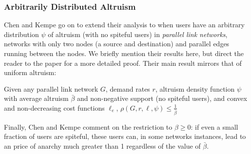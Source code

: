 \subsubsection{Arbitrarily Distributed Altruism}
Chen and Kempe go on to extend their analysis to when users have an arbitrary distribution $\psi$ of altruism (with no spiteful users) in \emph{parallel link networks}, networks with only two nodes (a source and destination) and parallel edges running between the nodes. 
We briefly mention their results here, but direct the reader to the paper for a more detailed proof.
Their main result mirrors that of uniform altruism:
\begin{theorem}
    Given any parallel link network $G$, demand rates $r$, altruism density function $\psi$ with average altruism $\bar{\beta}$ and non-negative support (no spiteful users), and convex and non-decreasing cost functions $\ell_e$,
   $\rho(G,r,\ell,\psi) \le \frac{1}{\bar{\beta}}$
\end{theorem}
Finally, Chen and Kempe comment on the restriction to $\beta \ge 0$: if even a small fraction of users are spiteful, these users can, in some networks instances, lead to an price of anarchy much greater than 1 regardless of the value of $\bar{\beta}$.
